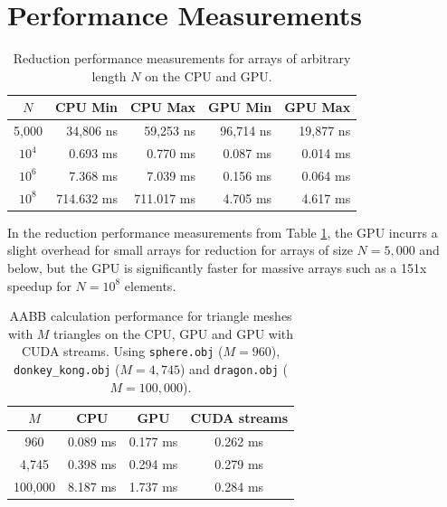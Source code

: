 \documentclass[../main.tex]{subfiles}
\begin{document}
\section{Performance Measurements}

\begin{table}[h]
  \caption{Reduction performance measurements for arrays of
  arbitrary length $N$ on the CPU and GPU.}
  \label{tab:reduction}
    \centering
    \begin{tabular}{|c|r|r|r|r|}
        \hline
        $N$ & \textbf{CPU Min} & \textbf{CPU Max} & \textbf{GPU Min} & \textbf{GPU Max} \\
        \hline
        5,000 & 34,806 ns & 59,253 ns & 96,714 ns & 19,877 ns \\
        $10^4$ & 0.693 ms & 0.770 ms & 0.087 ms & 0.014 ms \\
        $10^6$ & 7.368 ms & 7.039 ms & 0.156 ms & 0.064 ms \\
        $10^8$ & 714.632 ms & 711.017 ms & 4.705 ms & 4.617 ms \\
        \hline
    \end{tabular}
\end{table}

In the reduction performance measurements from Table \ref{tab:reduction}, the GPU incurrs a slight
overhead for small arrays for reduction for arrays of size $N = 5,000$ and below,
but the GPU is significantly faster for massive arrays such as a 151x speedup
for $N = 10^8$ elements.

\begin{table}[h]
    \caption{AABB calculation performance for triangle meshes with $M$ triangles on
    the CPU, GPU and GPU with CUDA streams. Using
    \texttt{sphere.obj} ($M = 960$), \texttt{donkey\_kong.obj} ($M = 4,745$)
    and \texttt{dragon.obj} ($M = 100,000$).}
    \label{tab:dk-reduction}
    \centering
    \begin{tabular}{|c|c|c|c|}
      \hline
      $M$ & \textbf{CPU} & \textbf{GPU} & \textbf{CUDA streams} \\
      \hline
      960 & 0.089 ms & 0.177 ms & 0.262 ms \\
      4,745 & 0.398 ms & 0.294 ms & 0.279 ms \\
      100,000 & 8.187 ms & 1.737 ms & 0.284 ms \\
      \hline
    \end{tabular}
\end{table}
\end{document}
